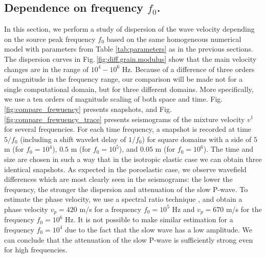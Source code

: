 \documentclass[3p,times,table]{article}
\begin{document}
\subsection{Dependence on frequency $f_{0}$.}\label{sec.frequency}

In this section, we perform a study of dispersion of the wave velocity depending on the 
source 
peak frequency $f_{0}$  based on the same homogeneous numerical model 
with 
parameters from Table \ref{tab:parameters} as in the previous sections. 
The dispersion curves in Fig.\,\ref{fig:diff.grain.modulus} show that the main 
velocity changes are in the range of $10^{4}-10^{6}$ Hz. Because of a difference of 
three orders of magnitude in the frequency range, our comparison will be made 
not 
for a single computational domain, but for three different 
domains. More specifically, we use a ten orders of magnitude scaling of  both space and 
time. Fig.\,\ref{fig:compare_frewuency} presents 
snapshots, and Fig.\,\ref{fig:compare_frewuency_trace} presents seismograms of 
the mixture velocity $v^1$ for several frequencies. For each time frequency, 
a snapshot is recorded at time $5/{f_{0}}$ (including a shift wavelet 
delay of $1/{f_{0}}$) for square domains with a side of $ 5 $ m (for 
$f_{0}=10^{4}$), $0.5$  m (for 
$f_{0}=10^{5}$), and $0.05$  m (for $f_{0}=10^{6}$). The time 
and size are chosen in such a way that in the isotropic elastic case 
we can obtain three identical snapshots. As expected in the poroelastic 
case, 
we 
observe wavefield differences which are most clearly seen in the seismograms: the 
lower the frequency, the stronger the dispersion and attenuation of the slow 
P-wave. 
To estimate the phase velocity, we use 
a spectral ratio technique 
\cite{Gurevich2015}, \cite{Caspari2019}
and obtain a 
phase velocity $v_{p}=420 $ m/s for a frequency $f_{0}=10^{5}$ Hz and
$v_{p}=670 $ m/s  for the frequency $f_{0}=10^{6}$ Hz. 
It is not possible to make 
similar estimation for a frequency $f_{0}=10^{4}$ due to the fact that the slow wave has a low amplitude. We 
can conclude that the attenuation of the slow P-wave is sufficiently strong even 
for high frequencies.
\end{document}
